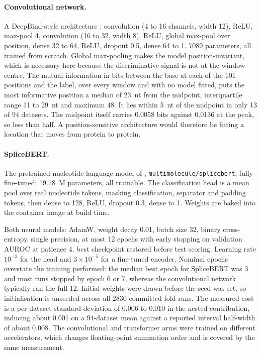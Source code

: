 \paragraph{Convolutional network.} A DeepBind-style architecture \citep{alipanahi2015}:
convolution (4 to 16 channels, width 12), ReLU, max-pool 4, convolution (16 to 32, width 8),
ReLU, global max-pool over position, dense 32 to 64, ReLU, dropout 0.5, dense 64 to 1. 7089
parameters, all trained from scratch. Global max-pooling makes the model position-invariant,
which is necessary here because the discriminative signal is not at the window centre. The
mutual information in bits between the base at each of the 101 positions and the label, over
every window and with no model fitted, puts the most informative position a median of 23~nt from
the midpoint, interquartile range 11 to 29~nt and maximum 48. It lies within 5~nt of the midpoint
in only 13 of 94 datasets. The midpoint
itself carries 0.0058 bits against 0.0136 at the peak, so less than half. A position-sensitive
architecture would therefore be fitting a location that moves from protein to protein.

\paragraph{SpliceBERT.} The pretrained nucleotide language model of \citet{chen2024},
\texttt{multimolecule/\allowbreak splicebert}, fully fine-tuned; 19.78~M parameters, all trainable. The
classification head is a mean pool over real nucleotide tokens, masking classification,
separator and padding tokens, then dense to 128, ReLU, dropout 0.3, dense to 1. Weights are
baked into the container image at build time.

Both neural models: AdamW, weight decay 0.01, batch size 32, binary cross-entropy, single
precision, at most 12 epochs with early stopping on validation AUROC at patience 4, best
checkpoint restored before test scoring. Learning rate $10^{-3}$ for the head and
$3\times10^{-5}$ for a fine-tuned encoder. Nominal epochs overstate the training
performed: the median best epoch for SpliceBERT was 3 and most runs stopped by epoch 6 or 7,
whereas the convolutional network typically ran the full 12. Initial weights were drawn before
the seed was set, so initialisation is unseeded across all 2830 committed fold-runs. The measured
cost is a per-dataset standard deviation of 0.006 to 0.010 in the nested contribution, inducing
about 0.001 on a 94-dataset mean against a reported interval half-width of about 0.008. The
convolutional and transformer arms were trained on different accelerators, which changes
floating-point summation order and is covered by the same measurement.

